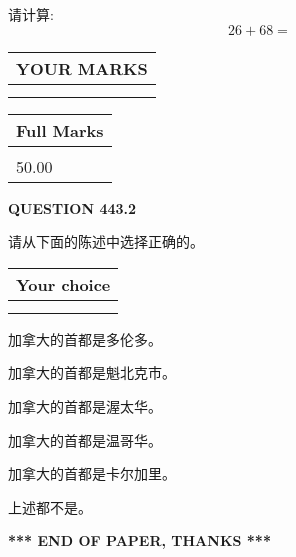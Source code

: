 \documentclass{ctexart}
\begin{document}
  
 
请计算:
\begin{equation}
26 +  %
68 = \nonumber
\end{equation}
 

 

 
  
\vspace{0.2in}
  
\noindent\begin{tabular}{|l|}
\hline
 YOUR MARKS  \\
\hline
 \\ 
 \\ 
\hline
\end{tabular}
\hspace{0.05in} \begin{tabular}{|l|}
\hline
 Full Marks  \\
\hline
 \\ 
50.00 \\
\hline
\end{tabular}
{\textbf{\Large{QUESTION
443.2 
}}}
  
  
请从下面的陈述中选择正确的。
  
  
\noindent\hspace{3.0in} \begin{tabular}{|l|}
\hline
Your choice \\
\hline
 \\ 
 \\ 
\hline
\end{tabular}
  
  
 
 
加拿大的首都是多伦多。
 
 
加拿大的首都是魁北克市。
 
 
加拿大的首都是渥太华。
 
 
加拿大的首都是温哥华。
 
 
加拿大的首都是卡尔加里。
 
 
 上述都不是。
 
 
   
   
 \vspace{0.2in}
 
   
   
   
   
\vspace{1.0in} 
{\textbf{\large{ *** END OF PAPER, THANKS *** }}} 
   
\end{document}
